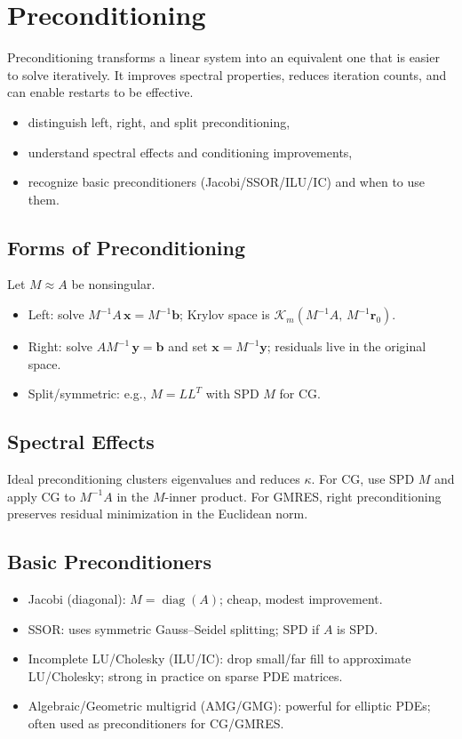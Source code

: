\chapter{Preconditioning}
\label{chap:preconditioning}

Preconditioning transforms a linear system into an equivalent one that is easier to solve iteratively. It improves spectral properties, reduces iteration counts, and can enable restarts to be effective.

\begin{learninggoals}[title={Learning goals}]
  \begin{itemize}[nosep]
    \item distinguish left, right, and split preconditioning,
    \item understand spectral effects and conditioning improvements,
    \item recognize basic preconditioners (Jacobi/SSOR/ILU/IC) and when to use them.
  \end{itemize}
\end{learninggoals}

\section{Forms of Preconditioning}
Let $M\approx A$ be nonsingular.
\begin{itemize}
  \item Left: solve $M^{-1}A\,\mathbf{x}=M^{-1}\mathbf{b}$; Krylov space is $\mathcal{K}_m(M^{-1}A,\,M^{-1}\mathbf{r}_0)$.
  \item Right: solve $AM^{-1}\,\mathbf{y}=\mathbf{b}$ and set $\mathbf{x}=M^{-1}\mathbf{y}$; residuals live in the original space.
  \item Split/symmetric: e.g., $M=LL^T$ with SPD $M$ for CG.
\end{itemize}

\section{Spectral Effects}
Ideal preconditioning clusters eigenvalues and reduces $\kappa$. For CG, use SPD $M$ and apply CG to $M^{-1}A$ in the $M$-inner product. For GMRES, right preconditioning preserves residual minimization in the Euclidean norm.

\section{Basic Preconditioners}
\begin{itemize}
  \item Jacobi (diagonal): $M=\operatorname{diag}(A)$; cheap, modest improvement.
  \item SSOR: uses symmetric Gauss--Seidel splitting; SPD if $A$ is SPD.
  \item Incomplete LU/Cholesky (ILU/IC): drop small/far fill to approximate LU/Cholesky; strong in practice on sparse PDE matrices.
  \item Algebraic/Geometric multigrid (AMG/GMG): powerful for elliptic PDEs; often used as preconditioners for CG/GMRES.
\end{itemize}

